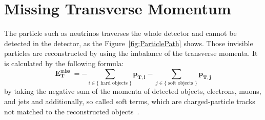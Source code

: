 \section{Missing Transverse Momentum}
The particle such as neutrinos traverses the whole detector and cannot be detected in the detector, as the Figure~\ref{fig:ParticlePath} shows. 
Those invisible particles are reconstructed by using the imbalance of the transverse momenta. 
It is calculated by the following formula:
\begin{equation}
\mathbf{E}_{\mathbf{T}}^{\text {miss }}=-\sum_{i \in\{\text { hard objects }\}} \mathbf{p}_{\mathbf{T}, \mathbf{i}}-\sum_{j \in\{\text { soft objects }\}} \mathbf{p_{T,\mathbf{j}}}
\end{equation}
by taking the negative sum of the momenta of detected objects, electrons, muons, and jets and additionally, so called soft terms, which are charged-particle tracks not matched to the reconstructed objects~\cite{PERF-2016-07}.
